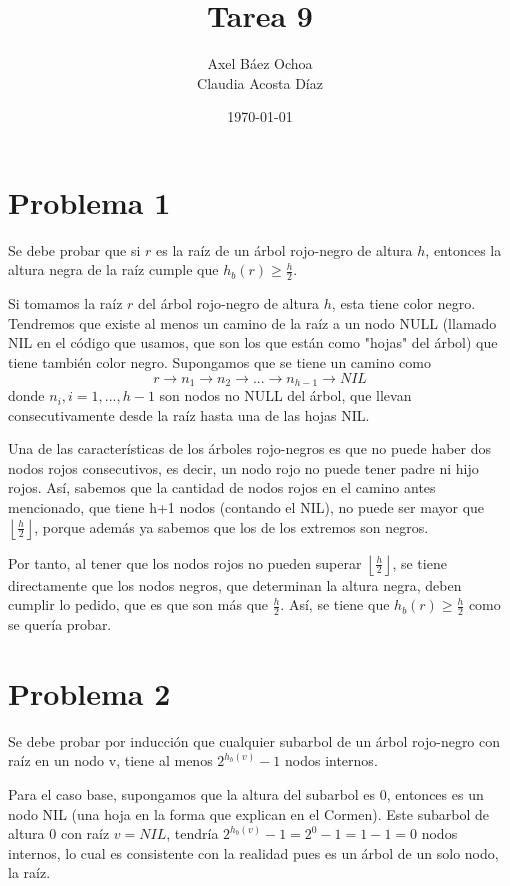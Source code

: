 \documentclass[12pt,letterpaper]{article}
\title{ \textbf{Tarea 9}}
\author{Axel Báez Ochoa\\
Claudia Acosta Díaz}
\date{\today}
\begin{document}
\maketitle
\section{Problema 1}
Se debe probar que si $r$ es la raíz de un árbol rojo-negro de altura $h$, entonces la altura negra de la raíz cumple que $h_{b}(r) \geq \frac{h}{2}$. \newline

Si tomamos la raíz $r$ del árbol rojo-negro de altura $h$, esta tiene color negro. Tendremos que existe al menos un camino de la raíz a un nodo NULL (llamado NIL en el código que usamos, que son los que están como "hojas" del árbol) que tiene también color negro. Supongamos que se tiene un camino como  
$$r\rightarrow n_1\rightarrow n_2\rightarrow...\rightarrow n_{h-1}\rightarrow NIL$$
donde $n_i, i=1,...,h-1 $ son nodos no NULL del árbol, que llevan consecutivamente desde la raíz hasta una de las hojas NIL.\newline 

Una de las características de los árboles rojo-negros es que no puede haber dos nodos rojos consecutivos, es decir, un nodo rojo no puede tener padre ni hijo rojos. Así, sabemos que la cantidad de nodos rojos en el camino antes mencionado, que tiene h+1 nodos (contando el NIL), no puede ser mayor que $\left\lfloor\frac{h}{2}\right\rfloor$, porque además ya sabemos que los de los extremos son negros. \newline

Por tanto, al tener que los nodos rojos no pueden superar $\left\lfloor\frac{h}{2}\right\rfloor$, se tiene directamente que los nodos negros, que determinan la altura negra, deben cumplir lo pedido, que es que son más que $\frac{h}{2}$. Así, se tiene que 
$h_b(r)\geq \frac{h}{2}$
como se quería probar. 


\section{Problema 2} 

Se debe probar por inducción que cualquier subarbol de un árbol rojo-negro con raíz en un nodo v, tiene al menos $2^{h_{b}(v)}-1$ nodos internos. \newline

Para el caso base, supongamos que la altura del subarbol es 0, entonces es un nodo NIL (una hoja en la forma que explican en el Cormen). Este subarbol de altura 0 con raíz $v= NIL$, tendría $2^{h_{b}(v)}-1=2^{0}-1=1-1=0$ nodos internos, lo cual es consistente con la realidad pues es un árbol de un solo nodo, la raíz. \newline
\end{document}
